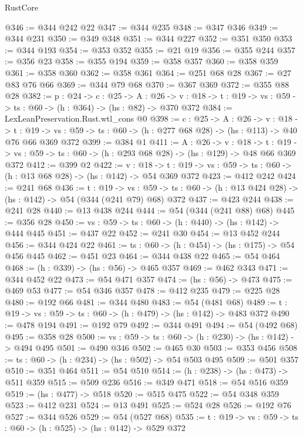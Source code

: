 \begin{lexlean}{RustCore}
\begin{coremodule}
@346 := @344 @242 @22
@347 := @344 @235
@348 := @347 @346
@349 := @344 @231
@350 := @349 @348
@351 := @344 @227
@352 := @351 @350
@353 := @344 @193
@354 := @353 @352
@355 := @21 @19
@356 := @355 @244
@357 := @356 @23
@358 := @355 @194
@359 := @358 @357
@360 := @358 @359
@361 := @358 @360
@362 := @358 @361
@364 := @251 @68 @28
@367 := @27 @83 @76 @66
@369 := @344 @79 @68
@370 := @367 @369
@372 := @355 @88 @28
@382 := {p : @24} ->
  {c : @25} ->
  {A : @26} ->
  {v : @18} -> {t : @19} -> {vs : @59} -> {ts : @60} -> (h : @364) -> (hs : @82) -> @370 @372
@384 := LexLeanPreservation.Rust.wtl_cons @0
@398 := {c : @25} ->
  {A : @26} ->
  {v : @18} ->
  {t : @19} ->
  {vs : @59} -> {ts : @60} -> (h : @277 @68 @28) -> (hs : @113) -> @40 @76 @66 @369 @372
@399 := @384 @1
@411 := {A : @26} ->
  {v : @18} ->
  {t : @19} -> {vs : @59} -> {ts : @60} -> (h : @293 @68 @28) -> (hs : @129) -> @48 @66 @369 @372
@412 := @399 @2
@422 := {v : @18} ->
  {t : @19} -> {vs : @59} -> {ts : @60} -> (h : @13 @68 @28) -> (hs : @142) -> @54 @369 @372
@423 := @412 @242
@424 := @241 @68
@436 := {t : @19} ->
  {vs : @59} -> {ts : @60} -> (h : @13 @424 @28) -> (hs : @142) -> @54 (@344 (@241 @79) @68) @372
@437 := @423 @244
@438 := @241 @28
@440 := @13 @438 @244
@444 := @54 (@344 (@241 @88) @68)
@445 := @356 @28
@450 := {vs : @59} -> {ts : @60} -> (h : @440) -> (hs : @142) -> @444 @445
@451 := @437 @22
@452 := @241 @30
@454 := @13 @452 @244
@456 := @344 @424 @22
@461 := {ts : @60} -> (h : @454) -> (hs : @175) -> @54 @456 @445
@462 := @451 @23
@464 := @344 @438 @22
@465 := @54 @464
@468 := (h : @339) -> (hs : @56) -> @465 @357
@469 := @462 @343
@471 := @344 @452 @22
@473 := @54 @471 @357
@474 := (hs : @56) -> @473
@475 := @469 @53
@477 := @54 @346 @357
@478 := @412 @235
@479 := @225 @28
@480 := @192 @66
@481 := @344 @480
@483 := @54 (@481 @68)
@489 := {t : @19} -> {vs : @59} -> {ts : @60} -> (h : @479) -> (hs : @142) -> @483 @372
@490 := @478 @194
@491 := @192 @79
@492 := @344 @491
@494 := @54 (@492 @68)
@495 := @358 @28
@500 := {vs : @59} -> {ts : @60} -> (h : @230) -> (hs : @142) -> @494 @495
@501 := @490 @346
@502 := @465 @30
@503 := @353 @456
@508 := {ts : @60} -> (h : @234) -> (hs : @502) -> @54 @503 @495
@509 := @501 @357
@510 := @351 @464
@511 := @54 @510
@514 := (h : @238) -> (hs : @473) -> @511 @359
@515 := @509 @236
@516 := @349 @471
@518 := @54 @516 @359
@519 := (hs : @477) -> @518
@520 := @515 @475
@522 := @54 @348 @359
@523 := @412 @231
@524 := @13 @491
@525 := @524 @28
@526 := @192 @76
@527 := @344 @526
@529 := @54 (@527 @68)
@535 := {t : @19} -> {vs : @59} -> {ts : @60} -> (h : @525) -> (hs : @142) -> @529 @372

\end{coremodule}
\end{lexlean}
